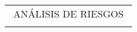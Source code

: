 \begin{adjustbox}{angle=90, captionbelow={DFMEA (Parte 1).}, float={table}[H]}
\end{adjustbox}

\newpage

\begin{adjustbox}{angle=90, captionbelow={DFMEA (Parte 2).}, float={table}[H]}

\setlength\arrayrulewidth{0.5pt}
\centering
\begin{tabular}{|ccccccccccccc|}
\hline
\multicolumn{13}{|c|}{ANÁLISIS DE RIESGOS}                                                                                                                                                                                                                                                                                                                                                                                                                                                                                                                                                                                                                                                                                                                                                                                                                                                                                                                                                                                                                                             \\
\multicolumn{1}{|l}{}                                              & \multicolumn{1}{l}{}                                                                                                      & \multicolumn{1}{l}{}                                                                                                      & \multicolumn{1}{l}{}                                                                                                                                    & \multicolumn{1}{l}{}                            & \multicolumn{1}{l}{}                            & \multicolumn{1}{l}{}                            & \multicolumn{1}{l}{}                            & \multicolumn{1}{l}{}                                                                                                                                                                                 & \multicolumn{1}{l}{}                            & \multicolumn{1}{l}{}                            & \multicolumn{1}{l}{}                            & \multicolumn{1}{l|}{}      \\ \cline{2-8}

\end{tabular}
\end{adjustbox}

